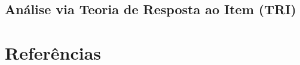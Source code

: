 \documentclass[
  portuguese,
  11pt,
  a4paper,
  DIV=11,
  numbers=noendperiod]{scrreprt}
\begin{document}
\begin{table}

\caption{\label{tbl-DIV_GROUP_DISCR}Frequência dos Grupos de Desempenho
da Prova do ENADE para o Curso de Sitemas de Informação.}


\end{table}%

\section{Análise via Teoria de Resposta ao Item
(TRI)}\label{anuxe1lise-via-teoria-de-resposta-ao-item-tri}


\chapter*{Referências}\label{referuxeancias}


\label{refs}
\end{document}
